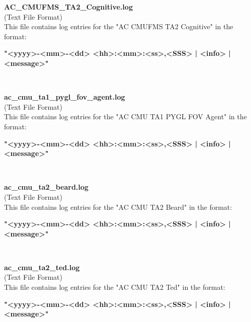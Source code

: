 \begin{description}
\begin{addmargin}[0em]{0em}
    \label{AC_CMUFMS_TA2_Cognitive.log}
    \begin{addmargin}[1em]{0em} %
        \textbf{AC\_CMUFMS\_TA2\_Cognitive.log}\\
        (Text File Format)\\
        This file contains log entries for the "AC CMUFMS TA2 Cognitive" in the format:
        \begin{addmargin}[1em]{0em}
            \textbf{"<yyyy>-<mm>-<dd> <hh>:<mm>:<ss>,<SSS> | <info> | <message>"}
        \end{addmargin}
    \end{addmargin} %
    \textbf{\\}

    \label{ac_cmu_ta1_pygl_fov_agent.log}
    \begin{addmargin}[1em]{0em} %
        \textbf{ac\_cmu\_ta1\_pygl\_fov\_agent.log}\\
        (Text File Format)\\
        This file contains log entries for the "AC CMU TA1 PYGL FOV Agent" in the format:
        \begin{addmargin}[1em]{0em}
            \textbf{"<yyyy>-<mm>-<dd> <hh>:<mm>:<ss>,<SSS> | <info> | <message>"}
        \end{addmargin}
    \end{addmargin} %
    \textbf{\\}

    \label{ac_cmu_ta2_beard.log}
    \begin{addmargin}[1em]{0em} %
        \textbf{ac\_cmu\_ta2\_beard.log}\\
        (Text File Format)\\
        This file contains log entries for the "AC CMU TA2 Beard" in the format:
        \begin{addmargin}[1em]{0em}
            \textbf{"<yyyy>-<mm>-<dd> <hh>:<mm>:<ss>,<SSS> | <info> | <message>"}
        \end{addmargin}
    \end{addmargin} %
    \textbf{\\}

    \label{ac_cmu_ta2_ted.log}
    \begin{addmargin}[1em]{0em} %
        \textbf{ac\_cmu\_ta2\_ted.log}\\
        (Text File Format)\\
        This file contains log entries for the "AC CMU TA2 Ted" in the format:
        \begin{addmargin}[1em]{0em}
            \textbf{"<yyyy>-<mm>-<dd> <hh>:<mm>:<ss>,<SSS> | <info> | <message>"}
        \end{addmargin}
    \end{addmargin} %
    \textbf{\\}


\end{addmargin}
\end{description}
